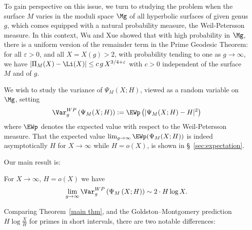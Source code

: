 \documentclass[12pt]{amsart}
\begin{document}
To gain perspective on this issue, we turn to studying the problem when the surface $M$ varies in the moduli space $\Mg$ of all hyperbolic surfaces of given genus $g$, which comes equipped with a natural probability measure, the Weil-Petersson measure. In this context, Wu and Xue \cite{WuXue} showed that with high probability in $\Mg$, there is a uniform version of the remainder term in the Prime Geodesic Theorem: for all $\varepsilon>0$, and all $X=X(g)>2$, with probability tending to one as  $g\to \infty$, we have $|\Pi_M(X)-\Li(X)|\leq c\, g\, X^{3/4+\varepsilon}$ with $c>0$ independent of the surface $M$ and of $g$.

We wish to study the variance of $\Psi_M(X;H)$, viewed as a random variable on $\Mg$, setting
\[
\Var^{WP}_g\left(\Psi_M(X;H)\right) :=\EWp\left( | \Psi_M(X;H)-H |^2 \right)
\]
 where $\EWp$ denotes the expected value with respect to the Weil-Petersson measure.
That the expected value  $\lim_{g\to \infty}\EWp(\Psi_M(X;H))$ is indeed asymptotically $H$ for $X\to \infty$ while $H=o(X)$, is shown in \S~\ref{sec:expectation}.









Our main result is: 
 \begin{thm}\label{main thm}
For  $X\to \infty$, $H=o(X)$ we have 
\[
 \lim_{g\to \infty} \Var^{WP}_g\left(\Psi_M\left(X;H\right) \right) \sim 2 \cdot H   \log X  .  
\]
\end{thm} 

 
 


Comparing Theorem~\ref{main thm}, and the Goldston--Montgomery prediction
$H\log \frac{X}{H}$ for primes in short intervals, there are two notable differences:
\end{document}
